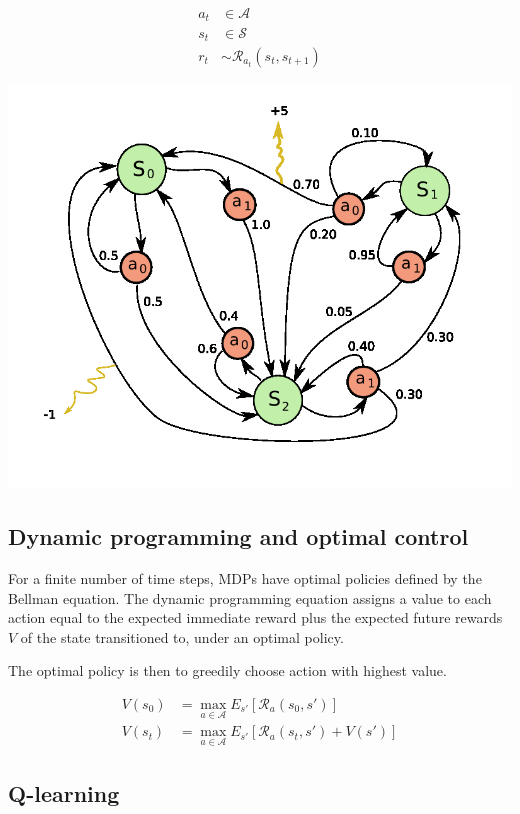 \documentclass[11pt,a4,singlespacing,titlepagenumber=on]{scrreprt}
\numberwithin{equation}{chapter} %
\theoremstyle{remark}
\begin{document}
\begin{align}
a_t &\in \mathcal{A} \\
s_t &\in \mathcal{S} \\
r_t &\sim \mathcal{R}_{a_t}(s_t,s_{t+1})
\end{align}

\includegraphics[scale=0.5]{MDP_example.png}

\subsection{ Dynamic programming and optimal control }

For a finite number of time steps, MDPs have optimal policies defined by the Bellman equation. The dynamic programming equation assigns a value to each action equal to the expected immediate reward plus the expected future rewards $V$ of the state transitioned to, under an optimal policy.

The optimal policy is then to greedily choose action with highest value.

\begin{align}
	V(s_0) &= \max_{a \in \mathcal{A}} E_{s'}[\mathcal{R}_a(s_0,s')] \\
	V(s_t) &= \max_{a \in \mathcal{A}} E_{s'}[\mathcal{R}_a(s_t,s') + V(s')]
\end{align}

\subsection{ Q-learning }
\end{document}
